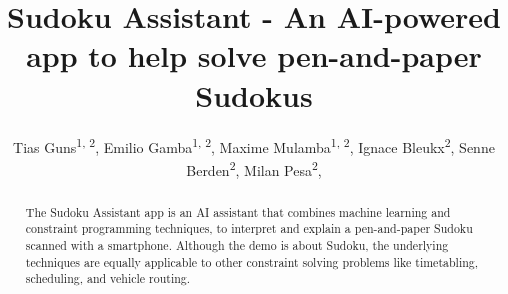 \documentclass[letterpaper]{article} %
\title{Sudoku Assistant - An AI-powered app to help solve pen-and-paper Sudokus}
\author{
    Tias Guns\textsuperscript{\rm1, \rm 2},   
    Emilio Gamba\textsuperscript{\rm1, \rm 2},
    Maxime Mulamba\textsuperscript{\rm1, \rm 2},
    Ignace Bleukx\textsuperscript{\rm 2},
    Senne Berden\textsuperscript{\rm 2},
    Milan Pesa\textsuperscript{\rm 2},
}
\begin{document}
\maketitle


\begin{abstract}
The Sudoku Assistant app is an AI assistant that combines machine learning and constraint programming techniques, to interpret and explain a pen-and-paper Sudoku scanned with a smartphone.
Although the demo is about Sudoku, the underlying techniques are equally applicable to other constraint solving problems like timetabling, scheduling, and vehicle routing.
\end{abstract}
%
%
%
%
%
%
%
%
\end{document}
